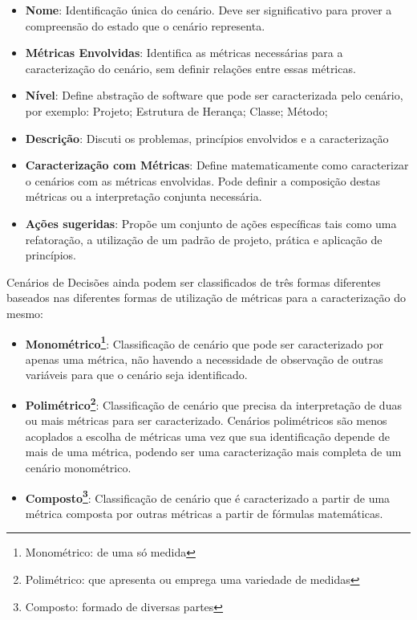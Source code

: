 \begin{itemize}
\item \textbf{Nome}: Identificação única do cenário. Deve ser significativo para prover a compreensão do estado que o cenário representa.

\item \textbf{Métricas Envolvidas}: Identifica as métricas necessárias para a caracterização do cenário, sem definir relações entre essas métricas.

\item \textbf{Nível}: Define abstração de software que pode ser caracterizada pelo cenário, por exemplo: Projeto; Estrutura de Herança; Classe; Método;

\item \textbf{Descrição}: Discuti os problemas, princípios envolvidos e a caracterização

\item \textbf{Caracterização com Métricas}: Define matematicamente como caracterizar o cenários com as métricas envolvidas. Pode definir a composição destas métricas ou a interpretação conjunta necessária.

\item \textbf{Ações sugeridas}: Propõe um conjunto de ações específicas tais como uma refatoração, a utilização de um padrão de projeto, prática e aplicação de princípios.
\end{itemize}

Cenários de Decisões ainda podem ser classificados de três formas diferentes baseados nas diferentes formas de utilização de métricas para a caracterização do mesmo:

\begin{itemize}
\item \textbf{Monométrico\footnote{Monométrico: de uma só medida}}: Classificação de cenário que pode ser caracterizado por apenas uma métrica, não havendo a necessidade de observação de outras variáveis para que o cenário seja identificado.

\item \textbf{Polimétrico\footnote{Polimétrico: que apresenta ou emprega uma variedade de medidas}}: Classificação de cenário que precisa da interpretação de duas ou mais métricas para ser caracterizado. Cenários polimétricos são menos acoplados a escolha de métricas uma vez que sua identificação depende de mais de uma métrica, podendo ser uma caracterização mais completa de um cenário monométrico. 

\item \textbf{Composto\footnote{Composto: formado de diversas partes}}: Classificação de cenário que é caracterizado a partir de uma métrica composta por outras métricas a partir de fórmulas matemáticas.
\end{itemize}


